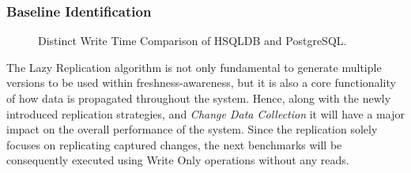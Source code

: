 \subsubsection{Baseline Identification} 




\begin{figure}[t] 
    \centering 
    \caption{Distinct Write Time Comparison of HSQLDB and PostgreSQL.}
    \label{fig:singlepsqlhsql}
\end{figure}

The Lazy Replication algorithm is not only fundamental to generate multiple versions to be used within freshness-awareness,
but it is also a core functionality of how data is propagated throughout the system. 
Hence, along with the newly introduced replication strategies, and \emph{Change Data Collection} it will have a major impact on the overall performance of the system.
Since the replication solely focuses on replicating captured changes, the next benchmarks will be consequently executed using Write Only operations without any reads.


